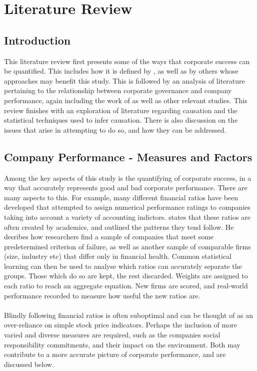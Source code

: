 %
%
%
\chapter{Literature Review}\label{C.LitReview}
\section{Introduction}\label{S.intro3}
{This literature review first presents some of the ways that corporate success can be quantified. This includes how it is defined by \cite{moldovan2015learning}, as well as by others whose approaches may benefit this study. This is followed by an analysis of literature pertaining to the relationship between corporate governance and company performance, again including the work of \cite{moldovan2015learning} as well as other relevant studies. This review finishes with an exploration of literature regarding causation and the statistical techniques used to infer causation. There is also discussion on the issues that arise in attempting to do so, and how they can be addressed. }
\section{Company Performance - Measures and Factors}
{Among the key aspects of this study is the quantifying of corporate success, in a way that accurately   represents good and bad corporate performance. There are many aspects to this. For example, many different financial ratios have been developed that attempted to assign numerical performance ratings to companies taking into account a variety of accounting indictors. \cite {eidleman1995z} states that these ratios are often created by academics, and outlined the patterns they tend follow. He desribes how researchers find a sample of companies that meet some predetermined criterion of failure, as well as another sample of comparable firms (size, industry etc) that differ only in financial health. Common statistical learning can then be used to analyse which ratios can accurately separate the groups. Those which do so are kept, the rest discarded. Weights are assigned to each ratio to reach an aggregate equation. New firms are scored, and real-world performance recorded to measure how useful the new ratios are. \\\\
Blindly following financial ratios is often suboptimal and can be thought of as an over-reliance on simple stock price indicators. Perhaps the inclusion of more varied and diverse measures are required, such as the companies social responsibility commitments, and their impact on the environment. Both may contribute to a more accurate picture of corporate performance, and are discussed below.       }
